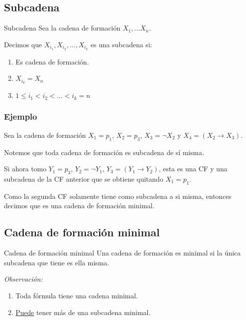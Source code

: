 \subsection{Subcadena}

\begin{definicion}{Subcadena}{}
    Sea la cadena de formación $X_1, \dots X_n$.

    \medskip

    Decimos que
    $X_{i_1}, X_{i_2}, \dotsc, X_{i_k}$ es una subcadena si:
    \begin{enumerate}
        \item Es cadena de formación.
        \item $X_{i_k} = X_n$ %
        \item $1 \leq i_1 < i_2 < \dots < i_k = n$
    \end{enumerate}
\end{definicion}

\subsubsection{Ejemplo}

Sea la cadena de formación $X_1 = p_1$, $X_2 = p_3$, $X_3 = \neg X_2$ y
$X_4 = (X_2 \to X_3)$.

Notemos que toda cadena de formación es subcadena de sí misma.

Si ahora tomo $Y_1 = p_3$, $Y_2 = \neg Y_1$, $Y_3 = (Y_1 \to Y_2)$, esta es
una CF y una subcadena de la CF anterior que se obtiene quitando $X_1 = p_1$.

Como la segunda CF solamente tiene como subcadena a si misma, entonces decimos
que es una cadena de formación minimal.


\subsection{Cadena de formación minimal}

\begin{definicion}{Cadena de formación minimal}{}
    Una cadena de formación es minimal si la única subcadena que tiene es
    ella misma.
\end{definicion}

\medskip
\textit{Observación:}
\begin{enumerate}
    \item Toda fórmula tiene una cadena minimal.
    \item {}%
    \underline{Puede} tener más de una subcadena minimal. 
\end{enumerate}

